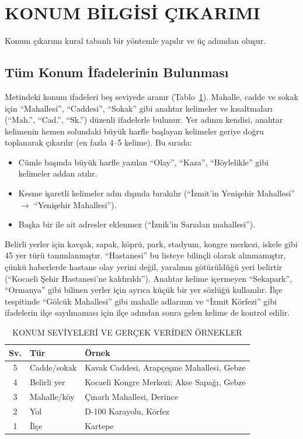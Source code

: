 \documentclass[conference,a4paper]{IEEEtran}
\begin{document}


\section{KONUM BİLGİSİ ÇIKARIMI}\label{sec:konum}
Konum çıkarımı kural tabanlı bir yöntemle yapılır ve üç adımdan oluşur.

\subsection{Tüm Konum İfadelerinin Bulunması}
Metindeki konum ifadeleri beş seviyede aranır (Tablo~\ref{tab:seviye}). Mahalle,
cadde ve sokak için ``Mahallesi'', ``Caddesi'', ``Sokak'' gibi anahtar kelimeler
ve kısaltmaları (``Mah.'', ``Cad.'', ``Sk.'') düzenli ifadelerle bulunur. Yer
adının kendisi, anahtar kelimenin hemen solundaki büyük harfle başlayan
kelimeler geriye doğru toplanarak çıkarılır (en fazla 4--5 kelime). Bu sırada:
\begin{itemize}
\item Cümle başında büyük harfle yazılan ``Olay'', ``Kaza'', ``Böylelikle'' gibi
kelimeler addan atılır.
\item Kesme işaretli kelimeler adın dışında bırakılır (``İzmit'in Yenişehir
Mahallesi'' $\rightarrow$ ``Yenişehir Mahallesi'').
\item Başka bir ile ait adresler eklenmez (``İznik'in Sarıalan mahallesi'').
\end{itemize}

Belirli yerler için kavşak, sapak, köprü, park, stadyum, kongre merkezi, iskele
gibi 45 yer türü tanımlanmıştır. ``Hastanesi'' bu listeye bilinçli olarak
alınmamıştır, çünkü haberlerde hastane olay yerini değil, yaralının götürüldüğü
yeri belirtir (``Kocaeli Şehir Hastanesi'ne kaldırıldı''). Anahtar kelime
içermeyen ``Sekapark'', ``Ormanya'' gibi bilinen yerler için ayrıca küçük bir yer
sözlüğü kullanılır. İlçe tespitinde ``Gölcük Mahallesi'' gibi mahalle adlarının ve
``İzmit Körfezi'' gibi ifadelerin ilçe sayılmaması için ilçe adından sonra gelen
kelime de kontrol edilir.

\begin{table}[!t]
\caption{KONUM SEVİYELERİ VE GERÇEK VERİDEN ÖRNEKLER}
\label{tab:seviye}
\centering\footnotesize
\begin{tabular}{@{}c p{} p{}@{}}
\toprule
\textbf{Sv.} & \textbf{Tür} & \textbf{Örnek} \\
\midrule
5 & Cadde/sokak & Kavak Caddesi, Arapçeşme Mahallesi, Gebze \\
4 & Belirli yer & Kocaeli Kongre Merkezi; Akse Sapağı, Gebze \\
3 & Mahalle/köy & Çınarlı Mahallesi, Derince \\
2 & Yol & D-100 Karayolu, Körfez \\
1 & İlçe & Kartepe \\
\bottomrule
\end{tabular}
\end{table}
\end{document}
